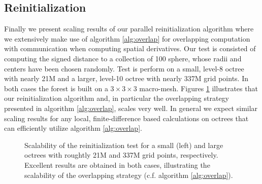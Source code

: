 \subsection{Reinitialization} \label{section::scaling_reinitialization}

Finally we present scaling results of our parallel reinitialization algorithm where we extensively make use of algorithm \ref{alg:overlap} for overlapping computation with communication when computing spatial derivatives. Our test is consisted of computing the signed distance to a collection of 100 sphere, whose radii and centers have been chosen randomly. Test is perform on a small, level-8 octree with nearly 21M and a larger, level-10 octree with nearly 337M grid points. In both cases the forest is built on a $3\times3\times3$ macro-mesh. Figures \ref{fig:reinit} illustrates that our reinitialization algorithm and, in particular the overlapping strategy presented in algorithm \ref{alg:overlap}, scales very well. In general we expect similar scaling results for any local, finite-difference based calculations on octrees that can efficiently utilize algorithm \ref{alg:overlap}. 
\begin{figure}
\centering
{}
\caption{Scalability of the reinitialization test for a small (left) and large octrees with roughtly 21M and 337M grid points, respectively. Excellent results are obtained in both cases, illustrating the scalability of the overlapping strategy (c.f. algorithm \ref{alg:overlap}).}
\label{fig:reinit}
\end{figure}

